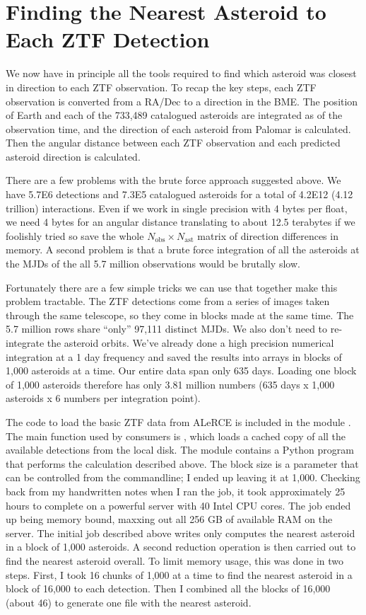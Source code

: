 \section{Finding the Nearest Asteroid to Each ZTF Detection}
\label{section_ztf_nearest_ast}
We now have in principle all the tools required to find which asteroid was closest in direction to each ZTF observation.
To recap the key steps, each ZTF observation is converted from a RA/Dec to a direction in the BME.
The position of Earth and each of the 733,489 catalogued asteroids are integrated as of the observation time, 
and the direction of each asteroid from Palomar is calculated.
Then the angular distance between each ZTF observation and each predicted asteroid direction is calculated.

There are a few problems with the brute force approach suggested above.
We have 5.7E6 detections and 7.3E5 catalogued asteroids for a total of 4.2E12 (4.12 trillion) interactions.
Even if we work in single precision with 4 bytes per float, we need 4 bytes for an angular distance
translating to about 12.5 terabytes if we foolishly tried so save the whole $N_{\mathrm{obs}} \times N_{\mathrm{ast}}$ 
matrix of direction differences in memory.
A second problem is that a brute force integration of all the asteroids at the MJDs of the all 5.7 million observations would be brutally slow.

Fortunately there are a few simple tricks we can use that together make this problem tractable.
The ZTF detections come from a series of images taken through the same telescope, so they come in blocks made at the same time.
The 5.7 million rows share ``only'' 97,111 distinct MJDs.
We also don't need to re-integrate the asteroid orbits.
We've already done a high precision numerical integration at a 1 day frequency and saved the results into  arrays in blocks of 1,000 asteroids at a time.
Our entire data span only 635 days.  
Loading one block of 1,000 asteroids therefore has only 3.81 million numbers (635 days x 1,000 asteroids x 6 numbers per integration point).

The code to load the basic ZTF data from ALeRCE is included in the module .
The main function used by consumers is , which loads a cached copy of all the available detections from the local disk.
The module  contains a Python program that performs the calculation described above.
The block size is a parameter that can be controlled from the commandline; I ended up leaving it at 1,000.
Checking back from my handwritten notes when I ran the job, it took approximately 25 hours to complete on a powerful server with 40 Intel CPU cores.
The job ended up being memory bound, maxxing out all 256 GB of available RAM on the server.
The initial job described above writes only computes the nearest asteroid in a block of 1,000 asteroids.
A second reduction operation is then carried out to find the nearest asteroid overall.
To limit memory usage, this was done in two steps.
First, I took 16 chunks of 1,000 at a time to find the nearest asteroid in a block of 16,000 to each detection.
Then I combined all the blocks of 16,000 (about 46) to generate one file with the nearest asteroid.

